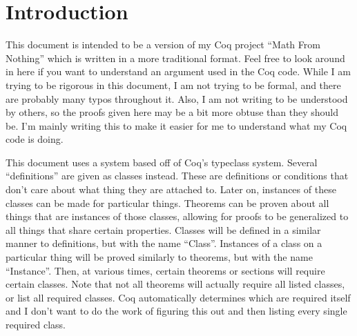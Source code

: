 \documentclass[../math.tex]{subfiles}
\begin{document}
\section*{Introduction}

This document is intended to be a version of my Coq project ``Math From
Nothing'' which is written in a more traditional format.  Feel free to look
around in here if you want to understand an argument used in the Coq code.
While I am trying to be rigorous in this document, I am not trying to be formal,
and there are probably many typos throughout it.  Also, I am not writing to be
understood by others, so the proofs given here may be a bit more obtuse than
they should be.  I'm mainly writing this to make it easier for me to understand
what my Coq code is doing.

This document uses a system based off of Coq's typeclass system.  Several
``definitions'' are given as classes instead.  These are definitions or
conditions that don't care about what thing they are attached to.  Later on,
instances of these classes can be made for particular things.  Theorems can be
proven about all things that are instances of those classes, allowing for proofs
to be generalized to all things that share certain properties.  Classes will be
defined in a similar manner to definitions, but with the name ``Class''.
Instances of a class on a particular thing will be proved similarly to theorems,
but with the name ``Instance''.  Then, at various times, certain theorems or
sections will require certain classes.  Note that not all theorems will actually
require all listed classes, or list all required classes.  Coq automatically
determines which are required itself and I don't want to do the work of figuring
this out and then listing every single required class.
\end{document}
